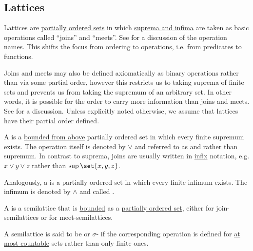 \subsection{Lattices}\label{subsec:lattices}

\begin{definition}\label{def:semilattice}
  Lattices are \hyperref[def:partially_ordered_set]{partially ordered sets} in which \hyperref[def:partially_ordered_set_extremal_points/supremum_and_infimum]{suprema and infima} are taken as basic operations called \enquote{joins} and \enquote{meets}. See  for a discussion of the operation names. This shifts the focus from ordering to operations, i.e. from predicates to functions.

  Joins and meets may also be defined axiomatically as binary operations rather than via some partial order, however this restricts us to taking suprema of finite sets and prevents us from taking the supremum of an arbitrary set. In other words, it is possible for the order to carry more information than joins and meets. See  for a discussion. Unless explicitly noted otherwise, we assume that lattices have their partial order defined.

  \begin{thmenum}[series=def:semilattice]
     A  is a \hyperref[def:partially_ordered_set_extremal_points/top_and_bottom]{bounded from above} partially ordered set in which every finite supremum exists. The operation itself is denoted by \( \vee \) and referred to as  and rather than supremum. In contrast to suprema, joins are usually written in \hyperref[rem:first_order_formula_conventions/infix]{infix} notation, e.g. \( x \vee y \vee z \) rather than \( \sup\set{ x, y, z } \).

     Analogously, a  is a partially ordered set in which every finite infimum exists. The infimum is denoted by \( \wedge \) and called .

     A  is a semilattice that is \hyperref[def:partially_ordered_set_extremal_points/top_and_bottom]{bounded} as a \hyperref[def:partially_ordered_set]{partially ordered set}, either  for join-semilattices or  for meet-semilattices.

     A semilattice is said to be  or \( \sigma \)- if the corresponding operation is defined for \hyperref[def:set_countability/at_most_countable]{at most countable} sets rather than only finite ones.


\end{thmenum}
\end{definition}
